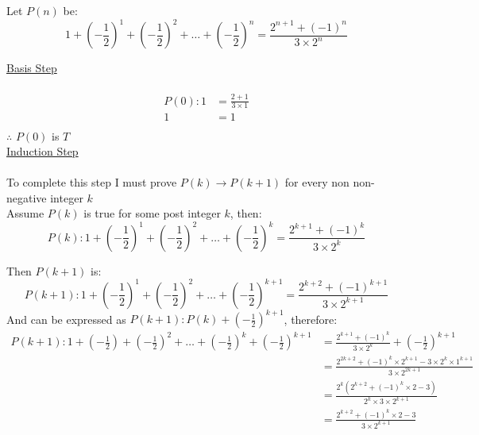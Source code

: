 \documentclass[12pt letter]{report}
\begin{document}
\begin{myproof}
  Let $P \left( n \right) $ be:
  \[
    1 + \left( -\frac{1}{2} \right)^1 + \left( -\frac{1}{2} \right)^2 + \ldots + \left( -\frac{1}{2} \right)^n = \frac{2^{n + 1} + \left( -1 \right)^n }{3\times 2^n}
  \]

  \noindent \underline{Basis Step} \\
  \\
  \begin{align*}
    P \left( 0 \right): 1 & = \frac{2 + 1}{3 \times 1 } \\
    1                     & = 1                         \\
  \end{align*}
  $\therefore$ $P \left( 0 \right) $ is $T$ \\

  \noindent \underline{Induction  Step} \\
  \\
  To complete this step I must prove $P \left( k \right) \to P \left( k + 1 \right)  $ for every non non-negative integer
  $k$ \\

  \noindent Assume $P \left( k \right) $ is true for some post integer $k$, then:
  \[
    P \left( k \right): 1 + \left( -\frac{1}{2} \right)^1 + \left( -\frac{1}{2} \right)^2 + \ldots + \left( -\frac{1}{2}
    \right)^k = \frac{2^{k + 1} + \left( -1 \right)^k }{3\times 2^k}
  \]

  Then $P \left( k + 1 \right) $ is:
  \[
    P \left( k + 1 \right): 1 + \left( -\frac{1}{2} \right)^1 + \left( -\frac{1}{2} \right)^2 + \ldots + \left(
    -\frac{1}{2} \right)^{k + 1} = \frac{2^{k + 2} + \left( -1 \right)^{k + 1} }{3\times 2^{k+ 1}}
  \]
  And can be expressed as $P \left( k + 1 \right): P \left( k \right) + \left( -\frac{1}{2} \right)^{k + 1}  $, therefore:
  \begin{align*}
    P \left( k + 1 \right): 1 + \left( -\frac{1}{2} \right) + \left( -\frac{1}{2} \right)^2 + \ldots + \left(
    -\frac{1}{2} \right)^{k} + \left( -\frac{1}{2} \right)^{k + 1} & = \frac{2^{k + 1}
      + \left( -1 \right)^{k} }{3
    \times 2^{k}} + \left( -\frac{1}{2} \right)^{k + 1}                                                                                                                         \\
                                                                   & = \frac{2^{2k + 2} + \left( -1 \right)^{k} \times
    2^{k + 1} - 3\times 2^k \times 1^{k + 1} }{3\times 2^{2k + 1}}                                                                                                              \\
                                                                   & = \frac{2^{k} \left( 2^{k + 2} + \left( -1 \right)^k\times 2 - 3  \right) }{2^k \times 3 \times 2^{k + 1}} \\
                                                                   & = \frac{2^{k + 2} + \left( -1 \right)^k \times 2 - 3 }{3 \times 2^{k + 1}}                                 \\
  \end{align*}

\end{myproof}
\end{document}
